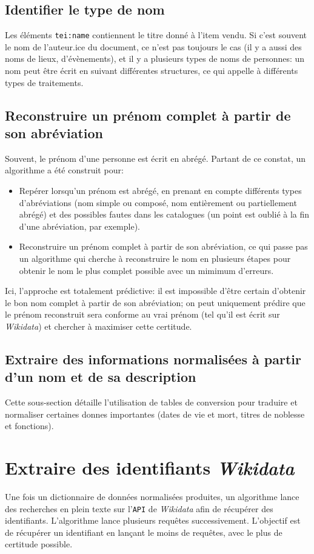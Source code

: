 \documentclass[a4paper, 12pt, twoside]{book}
\newcommand{\api}{\texttt{API}}
\newcommand{\wkd}{\textit{Wikidata}}
\begin{document}
\subsection{Identifier le type de nom}
Les éléments \texttt{tei:name} contiennent le titre donné à l'item vendu. Si c'est souvent le nom de l'auteur.ice du document, ce n'est pas toujours le cas (il y a aussi des noms de lieux, d'évènements), et il y a plusieurs types de noms de personnes: un nom peut être écrit en suivant différentes structures, ce qui appelle à différents types de traitements.

\subsection{Reconstruire un prénom complet à partir de son abréviation}
Souvent, le prénom d'une personne est écrit en abrégé. Partant de ce constat, un algorithme a été construit pour:
\begin{itemize}
	\item Repérer lorsqu'un prénom est abrégé, en prenant en compte différents types d'abréviations (nom simple ou composé, nom entièrement ou partiellement abrégé) et des possibles fautes dans les catalogues (un point est oublié à la fin d'une abréviation, par exemple).
	\item Reconstruire un prénom complet à partir de son abréviation, ce qui passe pas un algorithme qui cherche à reconstruire le nom en plusieurs étapes pour obtenir le nom le plus complet possible avec un mimimum d'erreurs.
\end{itemize}

Ici, l'approche est totalement prédictive: il est impossible d'être certain d'obtenir le bon nom complet à partir de son abréviation; on peut uniquement prédire que le prénom reconstruit sera conforme au vrai prénom (tel qu'il est écrit sur \wkd{}) et chercher à maximiser cette certitude.

\subsection{Extraire des informations normalisées à partir d'un nom et de sa description}
Cette sous-section détaille l'utilisation de tables de conversion pour traduire et normaliser certaines donnes importantes (dates de vie et mort, titres de noblesse et fonctions).

\section{Extraire des identifiants \wkd{}}
Une fois un dictionnaire de données normalisées produites, un algorithme lance des recherches en plein texte sur l'\api{} de \wkd{} afin de récupérer des identifiants. L'algorithme lance plusieurs requêtes successivement. L'objectif est de récupérer un identifiant en lançant le moins de requêtes, avec le plus de certitude possible.
\end{document}
